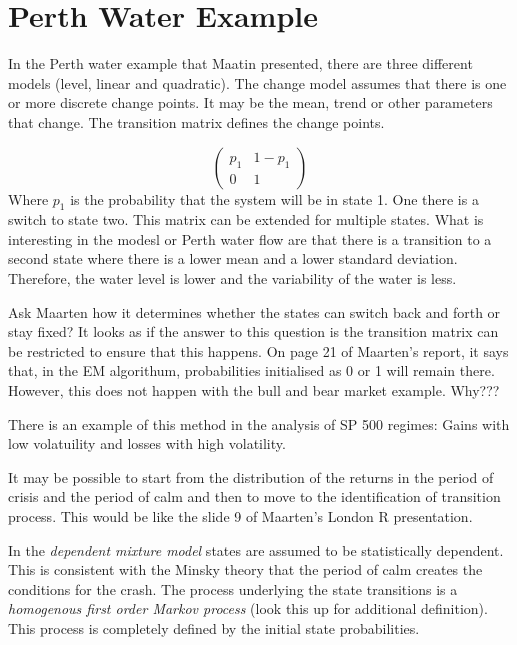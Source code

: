 \documentclass[12pt, a4paper, oneside]{article} %
\begin{document}
\section{Perth Water Example}

In the Perth water example that Maatin presented, there are three different models (level, linear and quadratic).  The change model assumes that there is one or more discrete change points.  It may be the mean, trend or other parameters that change. The transition matrix defines the change points.  

\begin{equation*}
\begin{pmatrix}
p_1 & 1 - p_1 \\
0 & 1
\end{pmatrix}
\end{equation*}
Where $p_1$ is the probability that the system will be in state 1.  One there is a switch to state two.  This matrix can be extended for multiple states. What is interesting in the modesl or Perth water flow are that there is a transition to a second state where there is a lower mean and a lower standard deviation. Therefore, the water level is lower and the variability of the water is less. 

Ask Maarten how it determines whether the states can switch back and forth or stay fixed?  It looks as if the answer to this question is the transition matrix can be restricted to ensure that this happens.  On page 21 of Maarten's report, it says that, in the EM algorithum, probabilities initialised as 0 or 1 will remain there.  However, this does not happen with the bull and bear market example.  Why???

There is an example of this method in the analysis of SP 500 regimes: Gains with low volatuility and losses with high volatility.  

It may be possible to start from the distribution of the returns in the period of crisis and the period of calm and then to move to the identification of transition process.  This would be like the slide 9 of Maarten's London R presentation. 

In the \emph{dependent mixture model} states are assumed to be statistically dependent.  This is consistent with the Minsky theory that the period of calm creates the conditions for the crash. The process underlying the state transitions is a \emph{homogenous first order Markov process}  (look this up for additional definition).  This process is completely defined by the initial state probabilities.  
\end{document}
